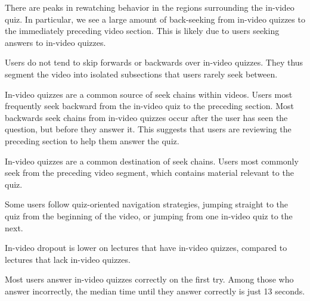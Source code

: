 \documentclass{sigchi}
\begin{document}
\begin{compactitem}
\item There are peaks in rewatching behavior in the regions surrounding the in-video quiz. In particular, we see a large amount of back-seeking from in-video quizzes to the immediately preceding video section. This is likely due to users seeking answers to in-video quizzes.
\item Users do not tend to skip forwards or backwards over in-video quizzes. They thus segment the video into isolated subsections that users rarely seek between.
\item In-video quizzes are a common source of seek chains within videos. Users most frequently seek backward from the in-video quiz to the preceding section. Most backwards seek chains from in-video quizzes occur after the user has seen the question, but before they answer it. This suggests that users are reviewing the preceding section to help them answer the quiz. %
\item In-video quizzes are a common destination of seek chains. Users most commonly seek from the preceding video segment, which contains material relevant to the quiz.
\item Some users follow quiz-oriented navigation strategies, jumping straight to the quiz from the beginning of the video, or jumping from one in-video quiz to the next.
\item In-video dropout is lower on lectures that have in-video quizzes, compared to lectures that lack in-video quizzes.
\item Most users answer in-video quizzes correctly on the first try. Among those who answer incorrectly, the median time until they answer correctly is just 13 seconds.
\end{compactitem}
\end{document}
